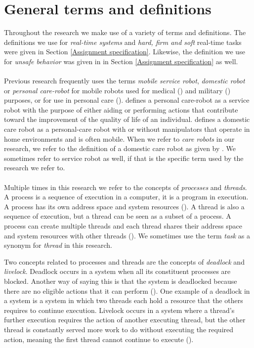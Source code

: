 \documentclass[12pt]{scrreprt}
\begin{document}
\section{General terms and definitions}
\label{Terms and defintions}
Throughout the research we make use of a variety of terms and definitions. The definitions we use for \textit{real-time systems} and \textit{hard, firm and soft} real-time tasks were given in Section \ref{Assignment specification}. Likewise, the definition we use for \textit{unsafe behavior} was given in in Section \ref{Assignment specification} as well.%
\\\\
Previous research frequently uses the terms \textit{mobile service robot}, \textit{domestic robot} or \textit{personal care-robot} for mobile robots used for medical (\cite{medical}) and military (\cite{military}) purposes, or for use in personal care (\cite{personal}). \citeauthor{tadele} defines a personal care-robot as a service robot with the purpose of either aiding or performing actions that contribute toward the improvement of the quality of life of an individual. \cite{tadele} defines a domestic care robot as a personal-care robot with or without manipulators that operate in home environments and is often mobile. When we refer to \textit{care robots} in our research, we refer to the definition of a domestic care robot as given by \citeauthor{tadele}. We sometimes refer to service robot as well, if that is the specific term used by the research we refer to.
\\\\
Multiple times in this research we refer to the concepts of \textit{processes} and \textit{threads}. A process is a sequence of execution in a computer, it is a program in execution. A process has its own address space and system resources (\cite{process_threads}). A thread is also a sequence of execution, but a thread can be seen as a subset of a process. A process can create multiple threads and each thread shares their address space and system resources with other threads (\cite{process_threads}). We sometimes use the term \textit{task} as a synonym for \textit{thread} in this research.
\par
Two concepts related to processes and threads are the concepts of \textit{deadlock} and \textit{livelock}. Deadlock occurs in a system when all its constituent processes are blocked. Another way of saying this is that the system is deadlocked because there are no eligible actions that it can perform (\cite{ltsa}). One example of a deadlock in a system is a system in which two threads each hold a resource that the others requires to continue execution. Livelock occurs in a system where a thread's further execution requires the action of another executing thread, but the other thread is constantly served more work to do without executing the required action, meaning the first thread cannot continue to execute (\cite{livelock_starvation}).
\end{document}
